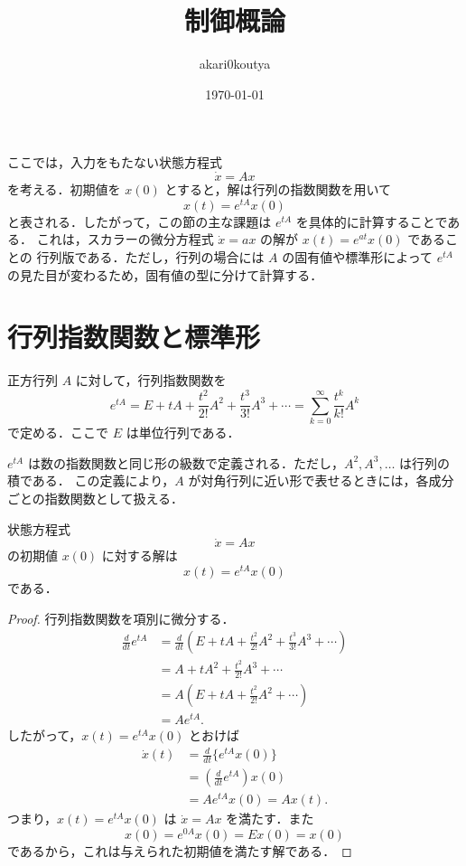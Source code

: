 \documentclass[article,paper=a4paper]{jlreq}
\title{制御概論}
\author{akari0koutya}
\date{\today}
\begin{document}
\maketitle
\tableofcontents

\clearpage


ここでは，入力をもたない状態方程式
\[
  \dot{x}=Ax
\]
を考える．初期値を $x(0)$ とすると，解は行列の指数関数を用いて
\[
  x(t)=e^{tA}x(0)
\]
と表される．したがって，この節の主な課題は $e^{tA}$ を具体的に計算することである．
これは，スカラーの微分方程式 $\dot{x}=ax$ の解が $x(t)=e^{at}x(0)$ であることの
行列版である．ただし，行列の場合には $A$ の固有値や標準形によって
$e^{tA}$ の見た目が変わるため，固有値の型に分けて計算する．

\section{行列指数関数と標準形}

\begin{dfn}
正方行列 $A$ に対して，行列指数関数を
\[
  e^{tA}
    =
    E+tA+\frac{t^2}{2!}A^2+\frac{t^3}{3!}A^3+\cdots
    =
    \sum_{k=0}^{\infty}\frac{t^k}{k!}A^k
\]
で定める．ここで $E$ は単位行列である．
\end{dfn}

\begin{rem}
$e^{tA}$ は数の指数関数と同じ形の級数で定義される．ただし，$A^2,A^3,\ldots$ は行列の積である．
この定義により，$A$ が対角行列に近い形で表せるときには，各成分ごとの指数関数として扱える．
\end{rem}

\begin{prop}
状態方程式
\[
  \dot{x}=Ax
\]
の初期値 $x(0)$ に対する解は
\[
  x(t)=e^{tA}x(0)
\]
である．
\end{prop}

\begin{proof}
行列指数関数を項別に微分する．
\begin{align*}
  \frac{d}{dt}e^{tA}
    &=
    \frac{d}{dt}
    \left(
      E+tA+\frac{t^2}{2!}A^2+\frac{t^3}{3!}A^3+\cdots
    \right)\\
    &=
    A+tA^2+\frac{t^2}{2!}A^3+\cdots\\
    &=
    A\left(E+tA+\frac{t^2}{2!}A^2+\cdots\right)\\
    &=Ae^{tA}.
\end{align*}
したがって，$x(t)=e^{tA}x(0)$ とおけば
\begin{align*}
  \dot{x}(t)
    &=
    \frac{d}{dt}\{e^{tA}x(0)\}\\
    &=
    \left(\frac{d}{dt}e^{tA}\right)x(0)\\
    &=
    Ae^{tA}x(0)
     =
    Ax(t).
\end{align*}
つまり，$x(t)=e^{tA}x(0)$ は $\dot{x}=Ax$ を満たす．また
\[
  x(0)=e^{0A}x(0)=Ex(0)=x(0)
\]
であるから，これは与えられた初期値を満たす解である．
\end{proof}
\end{document}
